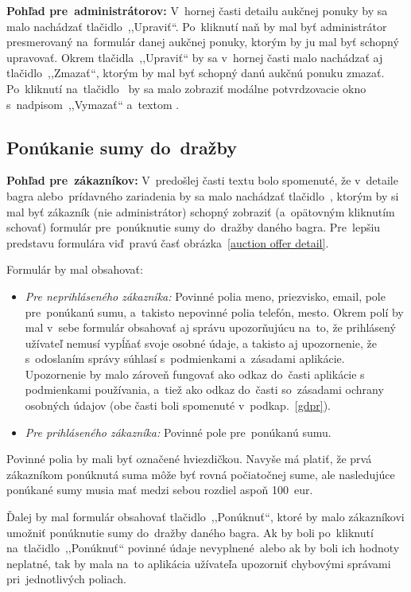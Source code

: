 \textbf{Pohľad pre~administrátorov:} V~hornej časti detailu aukčnej ponuky by sa malo nachádzať tlačidlo~,,Upraviť``. Po~kliknutí naň by mal byť administrátor presmerovaný na~formulár danej aukčnej ponuky, ktorým by ju mal byť schopný upravovať. Okrem tlačidla~,,Upraviť`` by sa v~hornej časti malo nachádzať aj tlačidlo~,,Zmazať``, ktorým by mal byť schopný danú aukčnú ponuku zmazať. Po~kliknutí na~tlačidlo~ by sa malo zobraziť modálne potvrdzovacie okno s~nadpisom~,,Vymazať`` a~textom .

\subsection{Ponúkanie sumy do~dražby}
\label{ponukanie sumy do drazby}

\textbf{Pohľad pre~zákazníkov:} V~predošlej časti textu bolo spomenuté, že v~detaile bagra alebo~prídavného zariadenia by sa malo nachádzať tlačidlo~, ktorým by si mal byť zákazník (nie administrátor) schopný zobraziť (a~opätovným kliknutím schovať) formulár pre~ponúknutie sumy do~dražby daného bagra. Pre~lepšiu predstavu formulára viď~pravú časť obrázka~\ref{auction offer detail}.

Formulár by mal obsahovať:
\begin{itemize}
\item \textit{Pre neprihláseného zákazníka:}
Povinné polia meno, priezvisko, email, pole pre~ponúkanú sumu, a~takisto nepovinné polia telefón, mesto. Okrem polí by mal v~sebe formulár obsahovať aj správu upozorňujúcu na~to, že prihlásený užívateľ nemusí vypĺňať svoje osobné údaje, a takisto aj upozornenie, že s~odoslaním správy súhlasí s~podmienkami a~zásadami aplikácie. Upozornenie by malo zároveň fungovať ako odkaz do~časti aplikácie s podmienkami používania, a~tiež ako odkaz do~časti so~zásadami ochrany osobných údajov (obe časti boli spomenuté v~podkap.~\ref{gdpr}).
\item \textit{Pre prihláseného zákazníka:}
Povinné pole pre~ponúkanú sumu.
\end{itemize}
Povinné polia by mali byť označené hviezdičkou. Navyše má platiť, že prvá zákazníkom ponúknutá suma môže byť rovná počiatočnej sume, ale nasledujúce ponúkané sumy musia mať medzi sebou rozdiel aspoň 100~eur.

Ďalej by mal formulár obsahovať tlačidlo~,,Ponúknuť``, ktoré by malo zákazníkovi umožniť ponúknutie sumy do~dražby daného bagra. Ak by boli po~kliknutí na~tlačidlo~,,Ponúknuť`` povinné údaje nevyplnené~alebo ak by boli ich hodnoty neplatné, tak by mala na~to aplikácia užívateľa upozorniť chybovými správami pri~jednotlivých poliach.
\newpage
